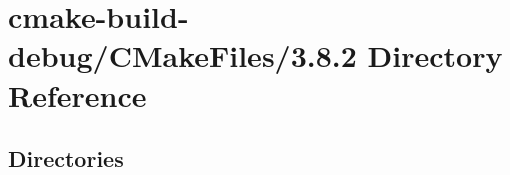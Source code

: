 \section{cmake-\/build-\/debug/\+C\+Make\+Files/3.8.2 Directory Reference}
\label{dir_2676cc314455a3554bf96ebb25d8a9e1}
\subsection*{Directories}
\begin{DoxyCompactItemize}
\end{DoxyCompactItemize}

